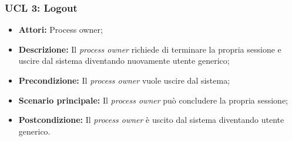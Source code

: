 \hypertarget{A3}{}
\subsubsection{UCL 3: Logout}
\begin{itemize}
	\item \textbf{Attori:} Process owner;
	\item \textbf{Descrizione:} Il \textit{process owner} richiede di terminare la propria sessione e uscire dal sistema diventando nuovamente utente generico;
	\item \textbf{Precondizione:} Il \textit{process owner} vuole uscire dal sistema;
	\item \textbf{Scenario principale:} Il \textit{process owner}  può concludere la propria sessione;
	\item \textbf{Postcondizione:} Il \textit{process owner} è uscito dal sistema diventando utente generico.
\end{itemize}
